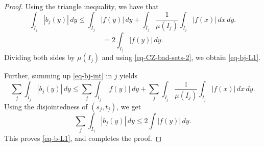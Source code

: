 {\begin{proof}
Using the triangle inequality, we have that
\begin{equation*}
    \int_{I_j} |b_j(y)|\, dy\leq \int_{I_j} |f(y)|\, dy + \int_{I_j} \frac{1}{\mu(I_j)}\int_{I_j} |f(x)|\, dx\, dy.
\end{equation*}
\begin{equation}
    \label{eq-bj-int}
    =2 \int_{I_j} |f(y)|\, dy.
\end{equation}
Dividing both sides by $\mu(I_j)$ and using \eqref{eq-CZ-bad-sets-2}, we obtain \eqref{eq-bj-L1}.

Further, summing up \eqref{eq-bj-int} in $j$ yields
\begin{equation*}
    \sum_{j}\int_{I_j} |b_j(y)|\, dy\leq \sum_{j}\int_{I_j} |f(y)|\, dy + \sum_{j}\int_{I_j} \frac{1}{\mu(I_j)}\int_{I_j} |f(x)|\, dx\, dy.
\end{equation*}
Using the disjointedness of $(s_j, t_j)$, we get
\begin{equation*}
    \sum_{j}\int_{I_j} |b_j(y)|\, dy\leq 2 \int |f(y)|\, dy.
\end{equation*}
This proves \eqref{eq-b-L1}, and completes the proof.
\end{proof}

}
